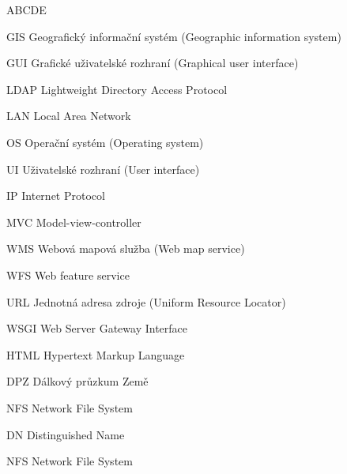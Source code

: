 
\begin{seznamzkratek}{ABCDE}      
	      
	      {GIS}
	      {Geografický informační systém (Geographic information system)}
	         
	      {GUI}
	      {Grafické uživatelské rozhraní (Graphical user interface)}
	           
	      {LDAP}
	      {Lightweight Directory Access Protocol} 
	      
	      {LAN}
	      {Local Area Network} 
	      	       
	      {OS}
	      {Operační systém (Operating system)} 

	      {UI}
	      {Uživatelské rozhraní (User interface)} 
	      
	      {IP}
	      {Internet Protocol} 	      	     

	      {MVC}
	      {Model-view-controller} 	

	      {WMS}
	      {Webová mapová služba (Web map service)} 	

	      {WFS}
	      {Web feature service} 	

	      {URL}
	      {Jednotná adresa zdroje (Uniform Resource Locator)}

	      {WSGI}
	      {Web Server Gateway Interface}

	      {HTML}
	      {Hypertext Markup Language}

	      {DPZ}
	      {Dálkový průzkum Země}

	      {NFS}
	      {Network File System}

	      {DN}
	      {Distinguished Name}
	      
	      {NFS}
	      {Network File System}
	      	      
\end{seznamzkratek}